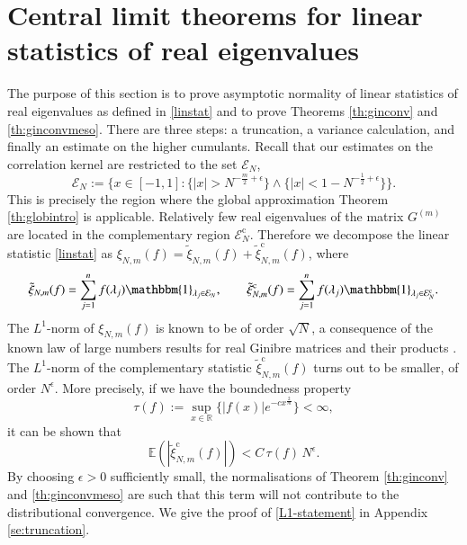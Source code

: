 \documentclass[11pt,reqno]{amsproc}
\numberwithin{equation}{section}
\numberwithin{theorem}{section}
\begin{document}
\section{Central limit theorems for linear statistics of real eigenvalues}
The purpose of this section is to prove asymptotic normality of linear statistics of real eigenvalues as defined in \eqref{linstat} and to prove Theorems \ref{th:ginconv} and \ref{th:ginconvmeso}. There are three steps: a truncation, a variance calculation, and finally an estimate on the higher cumulants. Recall that our estimates on the correlation kernel are restricted to the set $\mathcal{E}_{N}$, \begin{equation}
\mathcal{E}_{N} := \{x \in [-1,1] : \{|x| > N^{-\frac{m}{2}+\epsilon}\} \wedge \{|x| < 1-N^{-\frac{1}{2}+\epsilon}\}\}. \label{calen}
\end{equation}
This is precisely the region where the global approximation Theorem \ref{th:globintro} is applicable. Relatively few real eigenvalues of the matrix $G^{(m)}$ are located in the complementary region $\mathcal{E}_{N}^{\mathrm{c}}$. Therefore we decompose the linear statistic \eqref{linstat} as $\xi_{N,m}(f) = \tilde{\xi}_{N,m}(f) +  \tilde{\xi}^{\mathrm{c}}_{N,m}(f)$, where
\begin{equation}
\tilde{\xi}_{N,m}(f) = \sum_{j=1}^{n}f(\lambda_{j})\mathbbm{1}_{\lambda_{j} \in \mathcal{E}_{N}}, \qquad \tilde{\xi}^{\mathrm{c}}_{N,m}(f) = \sum_{j=1}^{n}f(\lambda_{j})\mathbbm{1}_{\lambda_{j} \in \mathcal{E}^{\mathrm{c}}_{N}}. \label{xidef}
\end{equation}
The $L^{1}$-norm of $\xi_{N,m}(f)$ is known to be of order $\sqrt{N}$, a consequence of the known law of large numbers results for real Ginibre matrices and their products \cite{EKS94,S17,LMS21}. The $L^{1}$-norm of the complementary statistic $\tilde{\xi}^{\mathrm{c}}_{N,m}(f)$ turns out to be smaller, of order $N^{\epsilon}$. More precisely, if we have the boundedness property
\begin{equation}
\tau(f) := \sup_{x \in \mathbb{R}}\bigg\{\lvert f(x) \rvert e^{-cx^{\frac{2}{m}}}\bigg\} < \infty,
\end{equation}
it can be shown that
\begin{equation}
\mathbb{E}\left(|\tilde{\xi}^{\mathrm{c}}_{N,m}(f)|\right) < C\,\tau(f)\,N^{\epsilon}. \label{L1-statement}
\end{equation}
By choosing $\epsilon>0$ sufficiently small, the normalisations of Theorem \ref{th:ginconv} and \ref{th:ginconvmeso} are such that this term will not contribute to the distributional convergence. We give the proof of \eqref{L1-statement} in Appendix \ref{se:truncation}. 
\end{document}
